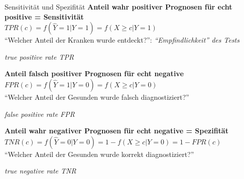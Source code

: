 \documentclass[
  10pt,
  ignorenonframetext,
]{beamer}
\begin{document}
\begin{frame}{Sensitivität und Spezifität}
\protect\hypertarget{sensitivituxe4t-und-spezifituxe4t-2}{}
\textbf{Anteil wahr positiver Prognosen für echt positive =
Sensitivität}\\
\(TPR(c) = f(\hat{Y}=1 | Y = 1) = f(X \geq c | Y=1)\)\\
``Welcher Anteil der Kranken wurde entdeckt?'':
\emph{``Empfindlichkeit'' des Tests}

\begin{footnotesize} \textit{true positive rate TPR} \end{footnotesize}

\hfill\break
\hfill\break

\textbf{Anteil falsch positiver Prognosen für echt negative}\\
\(FPR(c) = f(\hat{Y}=1 | Y=0) = f(X \geq c | Y=0)\)\\
``Welcher Anteil der Gesunden wurde falsch diagnostiziert?''

\begin{footnotesize} \textit{false positive rate FPR} \end{footnotesize}

\textbf{Anteil wahr negativer Prognosen für echt negative =
Spezifität}\\
\(TNR(c) = f(\hat{Y}=0 | Y=0) = 1 - f(X \geq c | Y=0) = 1 - FPR(c)\)\\
``Welcher Anteil der Gesunden wurde korrekt diagnostiziert?''

\begin{footnotesize} \textit{true negative rate TNR} \end{footnotesize}

\hfill\break
\end{frame}
\end{document}

